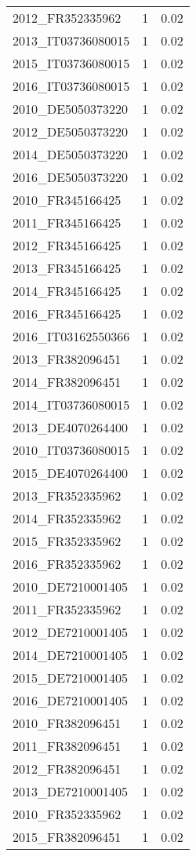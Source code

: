 \begin{table*}[htbp]
\begin{tabular}{lrr}
2012_FR352335962 & 1 & 0.02 \\
2013_IT03736080015 & 1 & 0.02 \\
2015_IT03736080015 & 1 & 0.02 \\
2016_IT03736080015 & 1 & 0.02 \\
2010_DE5050373220 & 1 & 0.02 \\
2012_DE5050373220 & 1 & 0.02 \\
2014_DE5050373220 & 1 & 0.02 \\
2016_DE5050373220 & 1 & 0.02 \\
2010_FR345166425 & 1 & 0.02 \\
2011_FR345166425 & 1 & 0.02 \\
2012_FR345166425 & 1 & 0.02 \\
2013_FR345166425 & 1 & 0.02 \\
2014_FR345166425 & 1 & 0.02 \\
2016_FR345166425 & 1 & 0.02 \\
2016_IT03162550366 & 1 & 0.02 \\
2013_FR382096451 & 1 & 0.02 \\
2014_FR382096451 & 1 & 0.02 \\
2014_IT03736080015 & 1 & 0.02 \\
2013_DE4070264400 & 1 & 0.02 \\
2010_IT03736080015 & 1 & 0.02 \\
2015_DE4070264400 & 1 & 0.02 \\
2013_FR352335962 & 1 & 0.02 \\
2014_FR352335962 & 1 & 0.02 \\
2015_FR352335962 & 1 & 0.02 \\
2016_FR352335962 & 1 & 0.02 \\
2010_DE7210001405 & 1 & 0.02 \\
2011_FR352335962 & 1 & 0.02 \\
2012_DE7210001405 & 1 & 0.02 \\
2014_DE7210001405 & 1 & 0.02 \\
2015_DE7210001405 & 1 & 0.02 \\
2016_DE7210001405 & 1 & 0.02 \\
2010_FR382096451 & 1 & 0.02 \\
2011_FR382096451 & 1 & 0.02 \\
2012_FR382096451 & 1 & 0.02 \\
2013_DE7210001405 & 1 & 0.02 \\
2010_FR352335962 & 1 & 0.02 \\
2015_FR382096451 & 1 & 0.02 \\

\end{tabular}
\end{table*}

